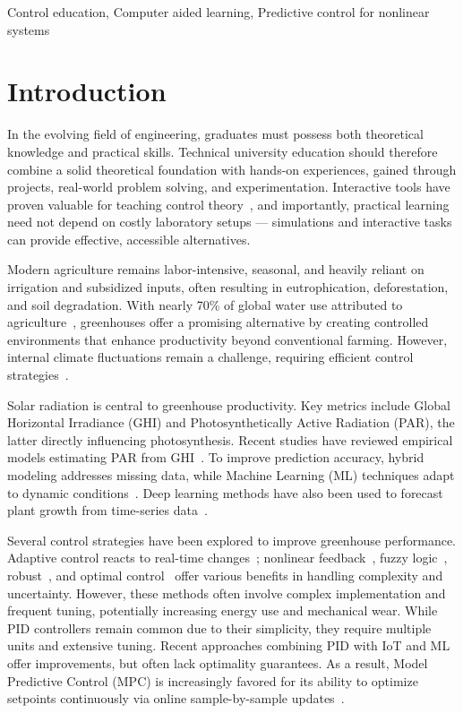 \documentclass[conference]{IEEEtran}
\begin{document}
\begin{IEEEkeywords}
    Control education, Computer aided learning, Predictive control for nonlinear systems
\end{IEEEkeywords}

\section{Introduction}
In the evolving field of engineering, graduates must possess both theoretical knowledge and practical skills. Technical university education should therefore combine a solid theoretical foundation with hands-on experiences, gained through projects, real-world problem solving, and experimentation. Interactive tools have proven valuable for teaching control theory~\cite{Emami1991, Guzman2013}, and importantly, practical learning need not depend on costly laboratory setups --- simulations and interactive tasks can provide effective, accessible alternatives.

Modern agriculture remains labor-intensive, seasonal, and heavily reliant on irrigation and subsidized inputs, often resulting in eutrophication, deforestation, and soil degradation. With nearly 70\% of global water use attributed to agriculture~\cite{Debroy2024}, greenhouses offer a promising alternative by creating controlled environments that enhance productivity beyond conventional farming. However, internal climate fluctuations remain a challenge, requiring efficient control strategies~\cite{Wu2019}.

Solar radiation is central to greenhouse productivity. Key metrics include Global Horizontal Irradiance (GHI) and Photosynthetically Active Radiation (PAR), the latter directly influencing photosynthesis. Recent studies have reviewed empirical models estimating PAR from GHI~\cite{NoriegaGardea2021}. To improve prediction accuracy, hybrid modeling addresses missing data, while Machine Learning (ML) techniques adapt to dynamic conditions~\cite{Iddio2020, MaLu2022}. Deep learning methods have also been used to forecast plant growth from time-series data~\cite{Yasrab2021}.

Several control strategies have been explored to improve greenhouse performance. Adaptive control reacts to real-time changes~\cite{Tian2022}; nonlinear feedback~\cite{Bood2023}, fuzzy logic~\cite{smartcities7030055}, robust~\cite{Zhang2021}, and optimal control~\cite{Debroy2024, SVENSEN2024108578} offer various benefits in handling complexity and uncertainty. However, these methods often involve complex implementation and frequent tuning, potentially increasing energy use and mechanical wear. While PID controllers remain common due to their simplicity, they require multiple units and extensive tuning. Recent approaches combining PID with IoT and ML~\cite{Wang2024} offer improvements, but often lack optimality guarantees. As a result, Model Predictive Control (MPC) is increasingly favored for its ability to optimize setpoints continuously via online sample-by-sample updates~\cite{Hu2022}.
\end{document}
